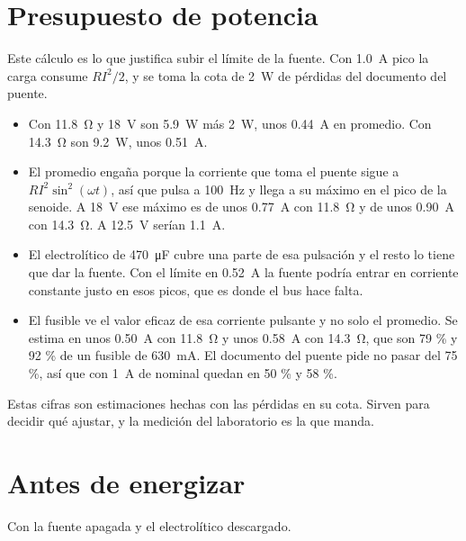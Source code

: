 \documentclass[11pt,a4paper]{article}
\begin{document}
\section{Presupuesto de potencia}

Este cálculo es lo que justifica subir el límite de la fuente. Con \SI{1.0}{A} pico la carga consume $R I^2/2$, y se toma la cota de \SI{2}{W} de pérdidas del documento del puente.

\begin{itemize}
\item Con \SI{11.8}{\ohm} y \SI{18}{V} son \SI{5.9}{W} más \SI{2}{W}, unos \SI{0.44}{A} en promedio. Con \SI{14.3}{\ohm} son \SI{9.2}{W}, unos \SI{0.51}{A}.
\item El promedio engaña porque la corriente que toma el puente sigue a $R I^2 \sin^2(\omega t)$, así que pulsa a \SI{100}{Hz} y llega a su máximo en el pico de la senoide. A \SI{18}{V} ese máximo es de unos \SI{0.77}{A} con \SI{11.8}{\ohm} y de unos \SI{0.90}{A} con \SI{14.3}{\ohm}. A \SI{12.5}{V} serían \SI{1.1}{A}.
\item El electrolítico de \SI{470}{\micro F} cubre una parte de esa pulsación y el resto lo tiene que dar la fuente. Con el límite en \SI{0.52}{A} la fuente podría entrar en corriente constante justo en esos picos, que es donde el bus hace falta.
\item El fusible ve el valor eficaz de esa corriente pulsante y no solo el promedio. Se estima en unos \SI{0.50}{A} con \SI{11.8}{\ohm} y unos \SI{0.58}{A} con \SI{14.3}{\ohm}, que son 79 \% y 92 \% de un fusible de \SI{630}{mA}. El documento del puente pide no pasar del 75 \%, así que con \SI{1}{A} de nominal quedan en 50 \% y 58 \%.
\end{itemize}

Estas cifras son estimaciones hechas con las pérdidas en su cota. Sirven para decidir qué ajustar, y la medición del laboratorio es la que manda.

\section{Antes de energizar}

Con la fuente apagada y el electrolítico descargado.
\end{document}
